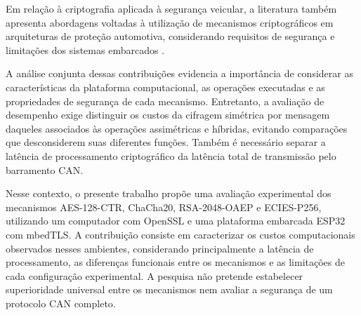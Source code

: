 Em relação à criptografia aplicada à segurança veicular, a literatura também apresenta abordagens voltadas à utilização de mecanismos criptográficos em arquiteturas de proteção automotiva, considerando requisitos de segurança e limitações dos sistemas embarcados \cite{mundhenk2017security}.

A análise conjunta dessas contribuições evidencia a importância de considerar as características da plataforma computacional, as operações executadas e as propriedades de segurança de cada mecanismo. Entretanto, a avaliação de desempenho exige distinguir os custos da cifragem simétrica por mensagem daqueles associados às operações assimétricas e híbridas, evitando comparações que desconsiderem suas diferentes funções. Também é necessário separar a latência de processamento criptográfico da latência total de transmissão pelo barramento CAN.

Nesse contexto, o presente trabalho propõe uma avaliação experimental dos mecanismos AES-128-CTR, ChaCha20, RSA-2048-OAEP e ECIES-P256, utilizando um computador com OpenSSL e uma plataforma embarcada ESP32 com mbedTLS. A contribuição consiste em caracterizar os custos computacionais observados nesses ambientes, considerando principalmente a latência de processamento, as diferenças funcionais entre os mecanismos e as limitações de cada configuração experimental. A pesquisa não pretende estabelecer superioridade universal entre os mecanismos nem avaliar a segurança de um protocolo CAN completo.

